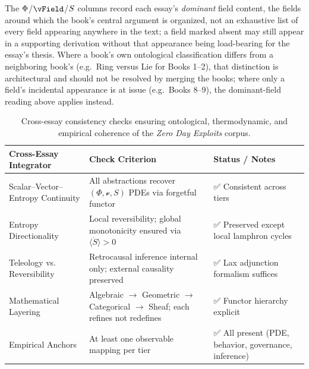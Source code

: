 \begin{table}[H]
{The $\Phi$/$\vField$/$S$ columns record each essay's \emph{dominant} field content, the fields around which the book's central argument is organized, not an exhaustive list of every field appearing anywhere in the text; a field marked absent may still appear in a supporting derivation without that appearance being load-bearing for the essay's thesis. Where a book's own ontological classification differs from a neighboring book's (e.g.\ Ring versus Lie for Books 1--2), that distinction is architectural and should not be resolved by merging the books; where only a field's incidental appearance is at issue (e.g.\ Books 8--9), the dominant-field reading above applies instead.}
\end{table}

\begin{table}[H]
\centering
\scriptsize
\renewcommand{\arraystretch}{1.25}
\setlength{\tabcolsep}{6pt}
\begin{tabular}{@{}lll@{}}
\toprule
\textbf{Cross-Essay Integrator} & \textbf{Check Criterion} & \textbf{Status / Notes} \\
\midrule
Scalar–Vector–Entropy Continuity & All abstractions recover $(\Phi,\boldsymbol{\mathcal{v}},S)$ PDEs via forgetful functor & ✅ Consistent across tiers \\
Entropy Directionality & Local reversibility; global monotonicity ensured via $\langle \dot S\rangle > 0$ & ✅ Preserved except local lamphron cycles \\
Teleology vs. Reversibility & Retrocausal inference internal only; external causality preserved & ✅ Lax adjunction formalism suffices \\
Mathematical Layering & Algebraic $\to$ Geometric $\to$ Categorical $\to$ Sheaf; each refines not redefines & ✅ Functor hierarchy explicit \\
Empirical Anchors & At least one observable mapping per tier & ✅ All present (PDE, behavior, governance, inference) \\
\bottomrule
\end{tabular}
\caption{Cross-essay consistency checks ensuring ontological, thermodynamic, and empirical coherence of the \emph{Zero Day Exploits} corpus.}
\end{table}
